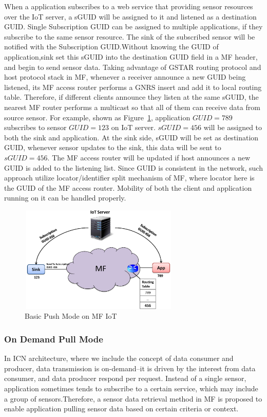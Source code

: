When a application subscribes to a web service that providing sensor resources over the IoT server, a sGUID will be assigned to it and listened as a destination GUID. Single Subscription GUID can be assigned to multiple applications, if they subscribe to the same sensor resource. The sink of the subscribed sensor will be notified with the Subscription GUID.Without knowing the GUID of application,sink set this sGUID into the destination GUID field in a MF header, and begin to send sensor data. Taking advantage of GSTAR\cite{} routing protocol and host protocol stack\cite{} in MF, whenever a receiver announce a new GUID being listened, its MF access router performs a GNRS insert and add it to local routing table. Therefore, if different clients announce they listen at the same sGUID, the nearest MF router performs a multicast so that all of them can receive data from source sensor. For example, shown as Figure~\ref{fig:pubsub}, application $GUID=789$ subscribes to sensor $GUID=123$ on IoT server. $sGUID=456$ will be assigned to both the sink and application. At the sink side, sGUID will be set as destination GUID, whenever sensor updates to the sink, this data will be sent to $sGUID=456$. The MF access router will be updated if host announces a new GUID is added to the listening list. Since GUID is consistent in the network, such approach utilize locator/identifier split mechanism of MF, where locator here is the GUID of the MF access router. Mobility of both the client and application running on it can be handled properly.   
\begin{figure}
\includegraphics[width=3.00in,height=2.00in]{pubsub_push.eps}
\caption{Basic Push Mode on MF IoT}
\label{fig:pubsub}
\end{figure}

\subsubsection{On Demand Pull Mode}
In ICN architecture, where we include the concept of data consumer and producer, data transmission is on-demand--it is driven by the interest from data consumer, and data producer respond per request. Instead of a single sensor, application sometimes tends to subscribe to a certain service, which may include a group of sensors.Therefore, a sensor data retrieval method in MF is proposed to enable application pulling sensor data based on certain criteria or context.

